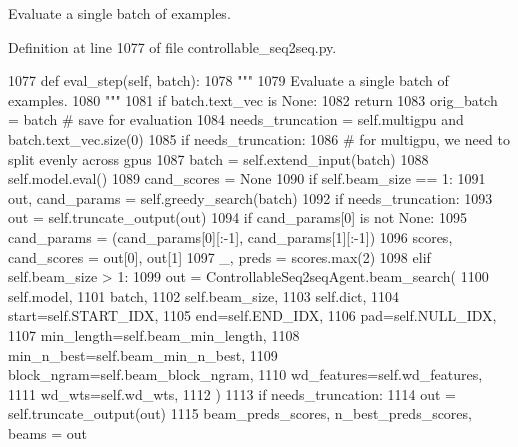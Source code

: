 \begin{DoxyVerb}Evaluate a single batch of examples.
\end{DoxyVerb}
 

Definition at line 1077 of file controllable\+\_\+seq2seq.\+py.


\begin{DoxyCode}
1077     \textcolor{keyword}{def }eval\_step(self, batch):
1078         \textcolor{stringliteral}{"""}
1079 \textcolor{stringliteral}{        Evaluate a single batch of examples.}
1080 \textcolor{stringliteral}{        """}
1081         \textcolor{keywordflow}{if} batch.text\_vec \textcolor{keywordflow}{is} \textcolor{keywordtype}{None}:
1082             \textcolor{keywordflow}{return}
1083         orig\_batch = batch  \textcolor{comment}{# save for evaluation}
1084         needs\_truncation = self.multigpu \textcolor{keywordflow}{and} batch.text\_vec.size(0) %
1085         \textcolor{keywordflow}{if} needs\_truncation:
1086             \textcolor{comment}{# for multigpu, we need to split evenly across gpus}
1087             batch = self.extend\_input(batch)
1088         self.model.eval()
1089         cand\_scores = \textcolor{keywordtype}{None}
1090         \textcolor{keywordflow}{if} self.beam\_size == 1:
1091             out, cand\_params = self.greedy\_search(batch)
1092             \textcolor{keywordflow}{if} needs\_truncation:
1093                 out = self.truncate\_output(out)
1094                 \textcolor{keywordflow}{if} cand\_params[0] \textcolor{keywordflow}{is} \textcolor{keywordflow}{not} \textcolor{keywordtype}{None}:
1095                     cand\_params = (cand\_params[0][:-1], cand\_params[1][:-1])
1096             scores, cand\_scores = out[0], out[1]
1097             \_, preds = scores.max(2)
1098         \textcolor{keywordflow}{elif} self.beam\_size > 1:
1099             out = ControllableSeq2seqAgent.beam\_search(
1100                 self.model,
1101                 batch,
1102                 self.beam\_size,
1103                 self.dict,
1104                 start=self.START\_IDX,
1105                 end=self.END\_IDX,
1106                 pad=self.NULL\_IDX,
1107                 min\_length=self.beam\_min\_length,
1108                 min\_n\_best=self.beam\_min\_n\_best,
1109                 block\_ngram=self.beam\_block\_ngram,
1110                 wd\_features=self.wd\_features,
1111                 wd\_wts=self.wd\_wts,
1112             )
1113             \textcolor{keywordflow}{if} needs\_truncation:
1114                 out = self.truncate\_output(out)
1115             beam\_preds\_scores, n\_best\_preds\_scores, beams = out

\end{DoxyCode}
